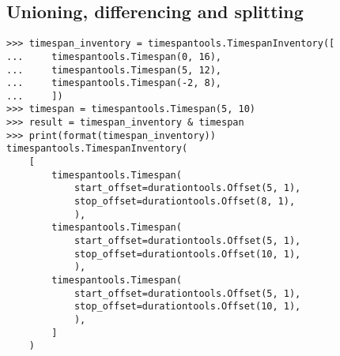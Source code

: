 \subsection{Unioning, differencing and splitting} %

\begin{comment}
<abjad>
timespan_inventory = timespantools.TimespanInventory([
    timespantools.Timespan(0, 16),
    timespantools.Timespan(5, 12),
    timespantools.Timespan(-2, 8),
    ])
timespan = timespantools.Timespan(5, 10)
result = timespan_inventory & timespan
print(format(timespan_inventory))
</abjad>
\end{comment}

\begin{singlespacing}
\vspace{-0.5\baselineskip}
\begin{lstlisting}
>>> timespan_inventory = timespantools.TimespanInventory([
...     timespantools.Timespan(0, 16),
...     timespantools.Timespan(5, 12),
...     timespantools.Timespan(-2, 8),
...     ])
>>> timespan = timespantools.Timespan(5, 10)
>>> result = timespan_inventory & timespan
>>> print(format(timespan_inventory))
timespantools.TimespanInventory(
    [
        timespantools.Timespan(
            start_offset=durationtools.Offset(5, 1),
            stop_offset=durationtools.Offset(8, 1),
            ),
        timespantools.Timespan(
            start_offset=durationtools.Offset(5, 1),
            stop_offset=durationtools.Offset(10, 1),
            ),
        timespantools.Timespan(
            start_offset=durationtools.Offset(5, 1),
            stop_offset=durationtools.Offset(10, 1),
            ),
        ]
    )
\end{lstlisting}
\end{singlespacing}

\begin{comment}
<abjad>
timespan_inventory = timespantools.TimespanInventory([
    timespantools.Timespan(0, 16),
    timespantools.Timespan(5, 12),
    timespantools.Timespan(-2, 8),
    ])
timespan = timespantools.Timespan(5, 10)
result = timespan_inventory - timespan
print(format(timespan_inventory))
</abjad>
\end{comment}

